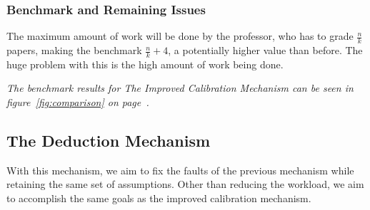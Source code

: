 \documentclass[12pt, Arial]{article}
\begin{document}
\subsubsection{Benchmark and Remaining Issues}
The maximum amount of work will be done by the professor, who has to grade $\frac{n}{k}$ papers, making the benchmark $\frac{n}{k}+4$, a potentially higher value than before. The huge problem with this is the high amount of work being done.

\emph{The benchmark results for The Improved Calibration Mechanism can be seen in figure~\ref{fig:comparison} on page~\pageref{fig:comparison}.}

\subsection{The Deduction Mechanism}
\label{sec:deduction}
With this mechanism, we aim to fix the faults of the previous mechanism while retaining the same set of assumptions. Other than reducing the workload, we aim to accomplish the same goals as the improved calibration mechanism.
\end{document}
